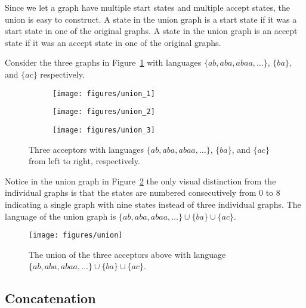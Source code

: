 Since we let a graph have multiple start states and multiple accept states, the
union is  easy to construct. A state in the union graph is a start state if it
was a start state in one of the original graphs. A state in the union graph is
an accept state if it was an accept state in one of the original graphs.

Consider the three graphs in Figure~\ref{fig:union_inputs} with languages
$\{ab, aba, abaa, \ldots\}$, $\{ba\}$, and $\{ac\}$ respectively.

\begin{figure}
    \centering
    \begin{subfigure}[b]{0.8\textwidth}
        \centering
        \texttt{[image: figures/union\_1]}
        \caption{}
    \end{subfigure}
    \par\bigskip
    \begin{subfigure}[b]{0.8\textwidth}
        \centering
        \texttt{[image: figures/union\_2]}
        \caption{}
    \end{subfigure}
    \par\bigskip
    \begin{subfigure}[b]{0.8\textwidth}
        \centering
        \texttt{[image: figures/union\_3]}
        \caption{}
    \end{subfigure}
    \caption{Three acceptors with languages $\{ab, aba, abaa, \ldots\}$,
    $\{ba\}$, and $\{ac\}$ from left to right, respectively.}
    \label{fig:union_inputs}
\end{figure}

Notice in the union graph in Figure~\ref{fig:union} the only visual distinction
from the individual graphs is that the states are numbered consecutively from
$0$ to $8$ indicating a single graph with nine states instead of three
individual graphs. The language of the union graph is $\{ab, aba, abaa,
\ldots\} \cup \{ba\} \cup \{ac\}$.

\begin{figure}
    \centering
    \texttt{[image: figures/union]}
    \caption{The union of the three acceptors above with language $\{ab, aba,
    abaa, \ldots\} \cup \{ba\} \cup \{ac\}$.}
    \label{fig:union}
\end{figure}

\subsection{Concatenation}


